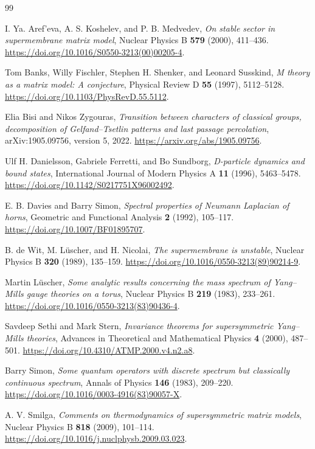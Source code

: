\documentclass[11pt]{amsart}
\theoremstyle{remark}
\numberwithin{equation}{section}
\begin{document}
\begin{thebibliography}{99}

I. Ya. Aref'eva, A. S. Koshelev, and P. B. Medvedev,
\emph{On stable sector in supermembrane matrix model},
Nuclear Physics B \textbf{579} (2000), 411--436.
\url{https://doi.org/10.1016/S0550-3213(00)00205-4}.

Tom Banks, Willy Fischler, Stephen H. Shenker, and Leonard Susskind,
\emph{M theory as a matrix model: A conjecture},
Physical Review D \textbf{55} (1997), 5112--5128.
\url{https://doi.org/10.1103/PhysRevD.55.5112}.

Elia Bisi and Nikos Zygouras,
\emph{Transition between characters of classical groups, decomposition of
Gelfand--Tsetlin patterns and last passage percolation},
arXiv:1905.09756, version 5, 2022.
\url{https://arxiv.org/abs/1905.09756}.

Ulf H. Danielsson, Gabriele Ferretti, and Bo Sundborg,
\emph{D-particle dynamics and bound states},
International Journal of Modern Physics A \textbf{11} (1996), 5463--5478.
\url{https://doi.org/10.1142/S0217751X96002492}.

E. B. Davies and Barry Simon,
\emph{Spectral properties of Neumann Laplacian of horns},
Geometric and Functional Analysis \textbf{2} (1992), 105--117.
\url{https://doi.org/10.1007/BF01895707}.

B. de Wit, M. L\"uscher, and H. Nicolai,
\emph{The supermembrane is unstable},
Nuclear Physics B \textbf{320} (1989), 135--159.
\url{https://doi.org/10.1016/0550-3213(89)90214-9}.

Martin L\"uscher,
\emph{Some analytic results concerning the mass spectrum of Yang--Mills
gauge theories on a torus},
Nuclear Physics B \textbf{219} (1983), 233--261.
\url{https://doi.org/10.1016/0550-3213(83)90436-4}.

Savdeep Sethi and Mark Stern,
\emph{Invariance theorems for supersymmetric Yang--Mills theories},
Advances in Theoretical and Mathematical Physics \textbf{4} (2000), 487--501.
\url{https://doi.org/10.4310/ATMP.2000.v4.n2.a8}.

Barry Simon,
\emph{Some quantum operators with discrete spectrum but classically
continuous spectrum},
Annals of Physics \textbf{146} (1983), 209--220.
\url{https://doi.org/10.1016/0003-4916(83)90057-X}.

A. V. Smilga,
\emph{Comments on thermodynamics of supersymmetric matrix models},
Nuclear Physics B \textbf{818} (2009), 101--114.
\url{https://doi.org/10.1016/j.nuclphysb.2009.03.023}.

\end{thebibliography}
\end{document}
